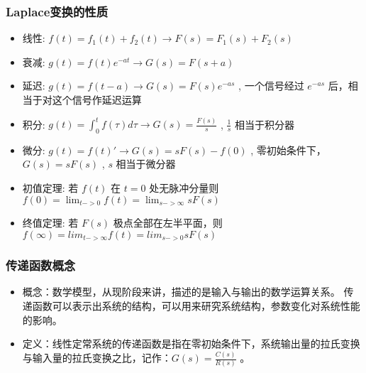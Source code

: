 \documentclass{beamer}
\begin{document}
\begin{frame}
\frametitle{Laplace变换的性质}
\label{sec-1-3}

\begin{itemize}
\item <2->线性: $f(t)=f_1(t)+f_2(t)\rightarrow  F(s)=F_1(s)+F_2(s)$
\item <3->衰减: $g(t)=f(t)e^{-at} \rightarrow G(s)=F(s+a)$
\item <4->延迟: $g(t)=f(t-a) \rightarrow  G(s)=F(s)e^{-as}$ , 一个信号经过 $e^{-as}$ 后，相当于对这个信号作延迟运算
\item <5->积分: $g(t)=\int_0^t f(\tau) d\tau \rightarrow  G(s)=\frac{F(s)}{s}$ , $\frac{1}{s}$ 相当于积分器
\item <6->微分: $g(t)=f(t)'\rightarrow  G(s)=sF(s)-f(0)$ , 零初始条件下， $G(s)=sF(s)$ , $s$ 相当于微分器
\item <7->初值定理: 若 $f(t)$ 在 $t=0$ 处无脉冲分量则 $f(0)=\lim_{t->0}f(t)=\lim_{s->\infty}sF(s)$
\item <8->终值定理: 若 $F(s)$ 极点全部在左半平面，则 $f(\infty)=lim_{t->\infty}f(t)=lim_{s->0}sF(s)$
\end{itemize}
\end{frame}
\begin{frame}
\frametitle{传递函数概念}
\label{sec-1-4}

\begin{itemize}
\item <2->概念：数学模型，从现阶段来讲，描述的是输入与输出的数学运算关系。 传递函数可以表示出系统的结构，可以用来研究系统结构，参数变化对系统性能的影响。
\item <3->定义：线性定常系统的传递函数是指在零初始条件下，系统输出量的拉氏变换与输入量的拉氏变换之比，记作：$G(s)=\frac{C(s)}{R(s)}$ 。
\end{itemize}
\end{frame}
\end{document}
